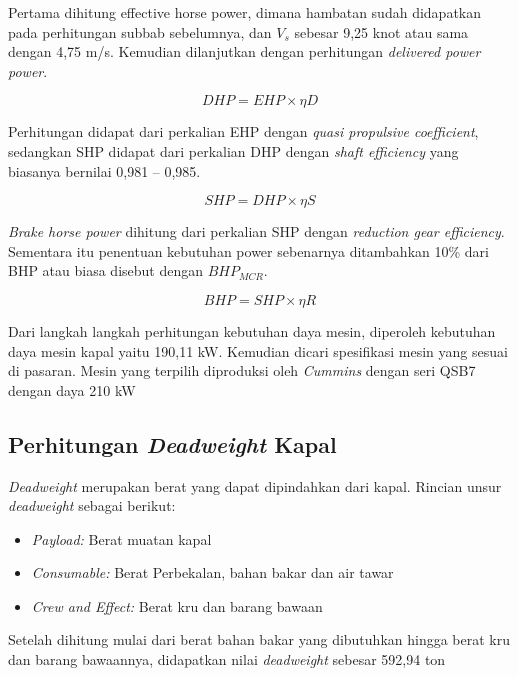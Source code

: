 Pertama dihitung effective horse power, dimana hambatan sudah didapatkan pada perhitungan subbab sebelumnya, dan $V_s$ sebesar 9,25 knot atau sama dengan 4,75 m/s. Kemudian dilanjutkan dengan perhitungan \emph{delivered power power}.

\begin{equation}
    DHP = EHP \times \eta D
\end{equation}

Perhitungan didapat dari perkalian EHP dengan \emph{quasi propulsive coefficient}, sedangkan SHP didapat dari perkalian DHP dengan \emph{shaft efficiency} yang biasanya bernilai 0,981 – 0,985.

\begin{equation}
    SHP = DHP \times \eta S
\end{equation}

\emph{Brake horse power} dihitung dari perkalian SHP dengan \emph{reduction gear efficiency}. Sementara
itu penentuan kebutuhan power sebenarnya ditambahkan 10\% dari BHP atau biasa disebut
dengan $BHP_{MCR}$.

\begin{equation}
    BHP = SHP \times \eta R
\end{equation}

Dari langkah langkah perhitungan kebutuhan daya mesin, diperoleh kebutuhan daya mesin kapal yaitu 190,11 kW. Kemudian dicari spesifikasi mesin yang sesuai di pasaran. Mesin yang terpilih diproduksi oleh \emph{Cummins} dengan seri QSB7 dengan daya 210 kW

\subsection{Perhitungan \emph{Deadweight} Kapal}
\label{subsec:perhitungan-dwt}

\emph{Deadweight} merupakan berat yang dapat dipindahkan dari kapal. Rincian unsur \emph{deadweight} sebagai berikut:
\begin{itemize}
    \item \emph{Payload:} Berat muatan kapal
    \item \emph{Consumable:}  Berat Perbekalan, bahan bakar dan air tawar
    \item \emph{Crew and Effect:} Berat kru dan barang bawaan
\end{itemize}

Setelah dihitung mulai dari berat bahan bakar yang dibutuhkan hingga berat kru dan barang bawaannya, didapatkan nilai \emph{deadweight} sebesar 592,94 ton


